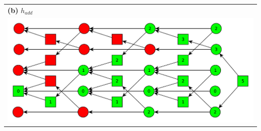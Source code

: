 \documentclass[11pt,a4paper]{article}
\begin{document}
\begin{tabular}{l} %
\textbf{(b)} $h_{add}$\\
\includegraphics[scale=0.5]{g63b}\\
\end{tabular}
\end{document}
